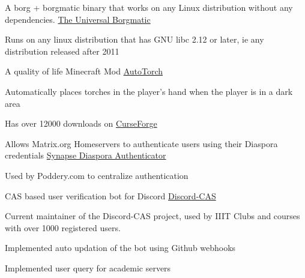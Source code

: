 
\begin{cventries}
  \cventry
    {A borg + borgmatic binary that works on any Linux distribution without any dependencies.} %
    {\href{https://github.com/necessary129/the-universal-borgmatic}{The Universal Borgmatic}} %
    {} %
    {} %
    {
      \begin{cvitems} %
		\item {Runs on any linux distribution that has GNU libc 2.12 or later, ie any distribution released after 2011}
      \end{cvitems}
    }
	
	\cventry
    {A quality of life Minecraft Mod} %
    {\href{https://www.curseforge.com/minecraft/mc-mods/auto-torch}{AutoTorch}} %
    {} %
    {} %
    {
      \begin{cvitems} %
        \item {Automatically places torches in the player's hand when the player is in a dark area}
        \item {Has over 12000 downloads on \href{https://www.curseforge.com/minecraft/mc-mods/auto-torch}{CurseForge}}
	\end{cvitems}
    }
	
	\cventry
	{Allows Matrix.org Homeservers to authenticate users using their Diaspora credentials} %
	{\href{https://matrix.org/docs/projects/other/synapse-diaspora-auth}{Synapse Diaspora Authenticator}} %
	{} %
	{} %
	{
	  \begin{cvitems} %
		\item {Used by Poddery.com to centralize authentication}
	  \end{cvitems}
	}

	\cventry
    {CAS based user verification bot for Discord} %
    {\href{https://github.com/Opensource-IIITH/Discord-CAS}{Discord-CAS}} %
    {} %
    {} %
    {
      \begin{cvitems} %
      	\item {Current maintainer of the Discord-CAS project, used by IIIT Clubs and courses with over 1000 registered users.}
		\item {Implemented auto updation of the bot using Github webhooks}
		\item {Implemented user query for academic servers}
      \end{cvitems}
    }


\end{cventries}
